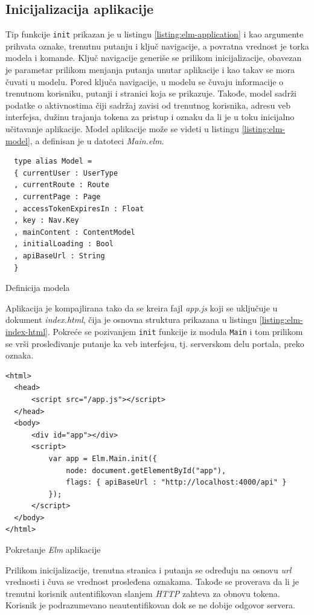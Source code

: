 \documentclass[12pt,oneside]{memoir}
\begin{document}
\subsection{Inicijalizacija aplikacije}
Tip funkcije \texttt{init} prikazan je u listingu \ref{listing:elm-application} i kao argumente prihvata oznake, trenutnu putanju i ključ navigacije,
a povratna vrednost je torka modela i komande. Ključ navigacije generiše se prilikom inicijalizacije, obavezan je parametar prilikom menjanja
putanja unutar aplikacije i kao takav se mora čuvati u modelu. Pored ključa navigacije, u modelu se čuvaju informacije o trenutnom korisniku,
putanji i stranici koja se prikazuje. Takođe, model sadrži podatke o aktivnostima čiji sadržaj zavisi od trenutnog korisnika, adresu veb interfejsa,
dužinu trajanja tokena za pristup i oznaku da li je u toku inicijalno učitavanje aplikacije. Model aplikacije može se videti u listingu \ref{listing:elm-model},
a definisan je u datoteci \emph{Main.elm}.
\begin{listing}[h]
\begin{verbatim}
  type alias Model =
  { currentUser : UserType
  , currentRoute : Route
  , currentPage : Page
  , accessTokenExpiresIn : Float
  , key : Nav.Key
  , mainContent : ContentModel
  , initialLoading : Bool
  , apiBaseUrl : String
  }
\end{verbatim}
\caption{Definicija modela}
\label{listing:elm-model}
\end{listing}

Aplikacija je kompajlirana tako da se kreira fajl \emph{app.js} koji se uključuje u dokument \emph{index.html},
čija je osnovna struktura prikazana u listingu \ref{listing:elm-index-html}. Pokreće se pozivanjem \texttt{init}
funkcije iz modula \texttt{Main} i tom prilikom se vrši prosleđivanje putanje ka veb interfejsu, tj. serverskom delu portala,
preko oznaka.
\begin{listing}[h]
\begin{verbatim}
<html>
  <head>
      <script src="/app.js"></script>
  </head>
  <body>
      <div id="app"></div>
      <script>
          var app = Elm.Main.init({
              node: document.getElementById("app"),
              flags: { apiBaseUrl : "http://localhost:4000/api" }
          });
      </script>
  </body>
</html>
\end{verbatim}
\caption{Pokretanje \emph{Elm} aplikacije}
\label{listing:elm-index-html}
\end{listing}
Prilikom inicijalizacije, trenutna stranica i putanja se određuju na osnovu \emph{url} vrednosti i
čuva se vrednost prosleđena oznakama. Takođe se proverava da li je trenutni korisnik autentifikovan
slanjem \emph{HTTP} zahteva za obnovu tokena. Korisnik je podrazumevano neautentifikovan dok se ne dobije
odgovor servera. 
\end{document}
